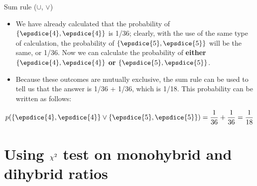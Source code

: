 \documentclass[11pt,ignorenonframetext,aspectratio=169]{beamer}
\providecommand{\tightlist}{%
  \setlength{\itemsep}{0pt}\setlength{\parskip}{0pt}}
\begin{document}
\begin{frame}{Sum rule (\(\cup\), \(\lor\))}
\protect\hypertarget{sum-rule-cup-lor}{}
\begin{itemize}
\tightlist
\item
  We have already calculated that the probability of
  \(\{\epsdice{4}, \epsdice{4}\}\) is 1/36; clearly, with the use of the
  same type of calculation, the probability of
  \(\{\epsdice{5}, \epsdice{5}\}\) will be the same, or 1/36. Now we can
  calculate the probability of \textbf{either}
  \(\{\epsdice{4}, \epsdice{4}\}\) \textbf{or}
  \(\{\epsdice{5}, \epsdice{5}\}\).
\item
  Because these outcomes are mutually exclusive, the sum rule can be
  used to tell us that the answer is 1/36 + 1/36, which is 1/18. This
  probability can be written as follows:
\end{itemize}

\[
p(\{\epsdice{4}, \epsdice{4}\} \lor \{\epsdice{5}, \epsdice{5}\}) = \frac{1}{36} + \frac{1}{36} = \frac{1}{18}
\]
\end{frame}

\hypertarget{using-large-chi2-test-on-monohybrid-and-dihybrid-ratios}{%
\section{\texorpdfstring{Using \(\Large \chi^2\) test on monohybrid and
dihybrid
ratios}{Using \textbackslash Large \textbackslash chi\^{}2 test on monohybrid and dihybrid ratios}}\label{using-large-chi2-test-on-monohybrid-and-dihybrid-ratios}}
\end{document}
